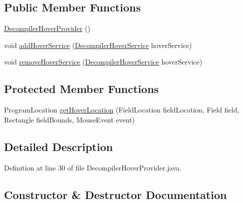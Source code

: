 \subsection*{Public Member Functions}
\begin{DoxyCompactItemize}
\item 
\mbox{\hyperlink{classghidra_1_1app_1_1decompiler_1_1component_1_1_decompiler_hover_provider_adee9149d22393c0f0a0ef1b94e0d38bb}{Decompiler\+Hover\+Provider}} ()
\item 
void \mbox{\hyperlink{classghidra_1_1app_1_1decompiler_1_1component_1_1_decompiler_hover_provider_ae6dca6081c1cbae2e5e08ff06aa4d7d9}{add\+Hover\+Service}} (\mbox{\hyperlink{interfaceghidra_1_1app_1_1decompiler_1_1component_1_1hover_1_1_decompiler_hover_service}{Decompiler\+Hover\+Service}} hover\+Service)
\item 
void \mbox{\hyperlink{classghidra_1_1app_1_1decompiler_1_1component_1_1_decompiler_hover_provider_a215fc1566ed4981c28c380cf19a70b5c}{remove\+Hover\+Service}} (\mbox{\hyperlink{interfaceghidra_1_1app_1_1decompiler_1_1component_1_1hover_1_1_decompiler_hover_service}{Decompiler\+Hover\+Service}} hover\+Service)
\end{DoxyCompactItemize}
\subsection*{Protected Member Functions}
\begin{DoxyCompactItemize}
\item 
Program\+Location \mbox{\hyperlink{classghidra_1_1app_1_1decompiler_1_1component_1_1_decompiler_hover_provider_a204f03a4c27026245c4a1cd3094616b7}{get\+Hover\+Location}} (Field\+Location field\+Location, Field field, Rectangle field\+Bounds, Mouse\+Event event)
\end{DoxyCompactItemize}


\subsection{Detailed Description}


Definition at line 30 of file Decompiler\+Hover\+Provider.\+java.



\subsection{Constructor \& Destructor Documentation}
\mbox{\label{classghidra_1_1app_1_1decompiler_1_1component_1_1_decompiler_hover_provider_adee9149d22393c0f0a0ef1b94e0d38bb}} 
